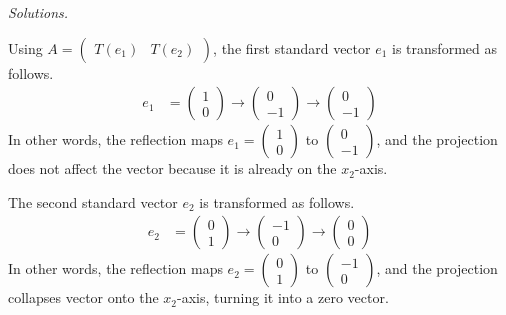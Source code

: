     \ifnum {} {\color{DarkBlue} \textit{Solutions.} 

    Using $A = \begin{pmatrix} T(e_1) & T(e_2) \end{pmatrix}$, the first standard vector $e_1$ is transformed as follows.
    \begin{align}
        e_1 &= \begin{pmatrix} 1\\0 \end{pmatrix} \to \begin{pmatrix} 0\\-1 \end{pmatrix} \to \begin{pmatrix}0\\-1 \end{pmatrix} 
    \end{align}
    In other words, the reflection maps $e_1 = \begin{pmatrix}1\\0 \end{pmatrix}$ to $\begin{pmatrix} 0\\-1 \end{pmatrix}$, and the projection does not affect the vector because it is already on the $x_2$-axis. 

    The second standard vector $e_2$ is transformed as follows. 
    \begin{align}
        e_2 &= \begin{pmatrix} 0\\1 \end{pmatrix} \to \begin{pmatrix} -1\\0 \end{pmatrix} \to \begin{pmatrix}0\\0 \end{pmatrix} 
    \end{align}
    In other words, the reflection maps $e_2 = \begin{pmatrix}0\\1 \end{pmatrix}$ to $\begin{pmatrix} -1\\0 \end{pmatrix}$, and the projection collapses vector onto the $x_2$-axis, turning it into a zero vector. 

}
